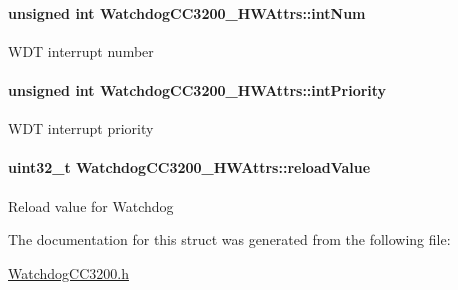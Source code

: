 \paragraph[{int\+Num}]{\setlength{\rightskip}{0pt plus 5cm}unsigned int Watchdog\+C\+C3200\+\_\+\+H\+W\+Attrs\+::int\+Num}\label{struct_watchdog_c_c3200___h_w_attrs_a49a550cfb37091acc532cfe0330a1c15}
W\+D\+T interrupt number 
\paragraph[{int\+Priority}]{\setlength{\rightskip}{0pt plus 5cm}unsigned int Watchdog\+C\+C3200\+\_\+\+H\+W\+Attrs\+::int\+Priority}\label{struct_watchdog_c_c3200___h_w_attrs_a3e770e95811c62d92e8c4b9307e2c6be}
W\+D\+T interrupt priority 
\paragraph[{reload\+Value}]{\setlength{\rightskip}{0pt plus 5cm}uint32\+\_\+t Watchdog\+C\+C3200\+\_\+\+H\+W\+Attrs\+::reload\+Value}\label{struct_watchdog_c_c3200___h_w_attrs_a746d7acdd50828840459d4d78171d780}
Reload value for Watchdog 

The documentation for this struct was generated from the following file\+:\begin{DoxyCompactItemize}
\item 
\hyperlink{_watchdog_c_c3200_8h}{Watchdog\+C\+C3200.\+h}\end{DoxyCompactItemize}
